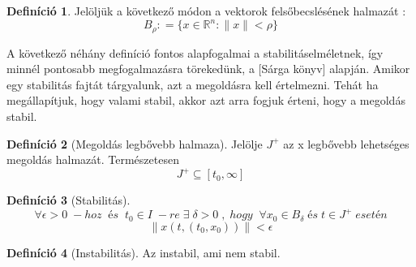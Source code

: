 \documentclass{article}
\theoremstyle{definition}
\theoremstyle{theorem}
\newtheorem{definition}{Definíció}
\begin{document}
\begin{definition}
Jelöljük a következő módon a vektorok felsőbecslésének halmazát :
\begin{equation*}
    B_{\rho} : = \{ x \in \mathbb{R}^n: \lVert x \rVert < \rho \}
\end{equation*}
\end{definition}
A következő néhány definíció fontos alapfogalmai a stabilitáselméletnek, így minnél pontosabb megfogalmazásra törekedünk, a [Sárga könyv] alapján. Amikor egy stabilitás fajtát tárgyalunk, azt a megoldásra kell értelmezni. Tehát ha megállapítjuk, hogy valami stabil, akkor azt arra fogjuk érteni, hogy a megoldás stabil.
\begin{definition}[Megoldás legbővebb halmaza]
Jelölje $J^+$ az x legbővebb lehetséges megoldás halmazát. Természetesen
\begin{equation*}
    J^+ \subseteq [t_0, \infty]
\end{equation*}
\end{definition}
\begin{definition} [Stabilitás]
\begin{equation*}
    \forall \epsilon > 0 \;-hoz\;\;és\;\;t_0 \in I \;-re\; \exists\;
    \delta >0\;,\;hogy\;\; \forall x_0 \in B_{\delta} \;és\; t \in J^+ \;esetén
\end{equation*}
\begin{equation*}
    \lVert x(t,(t_0,x_0)) \rVert < \epsilon
\end{equation*}
\end{definition}

\begin{definition}[Instabilitás]
Az instabil, ami nem stabil.
\end{definition}
\end{document}
